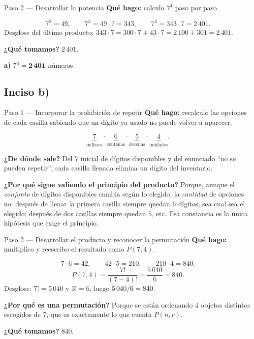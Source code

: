 \documentclass[11pt]{article}
\begin{document}
\begin{paso}{Paso 2 --- Desarrollar la potencia}
\textbf{Qué hago:} calculo $7^4$ paso por paso.

\[
7^2 = 49,\qquad 7^3 = 49\cdot 7 = 343,\qquad 7^4 = 343\cdot 7 = 2\,401 .
\]
Desglose del último producto: $343\cdot 7 = 300\cdot 7 + 43\cdot 7 = 2\,100+301 = 2\,401$.

\textbf{¿Qué tomamos?} $2\,401$.
\end{paso}

\begin{resp}
\textbf{a)} $7^4 = \mathbf{2\,401}$ números.
\end{resp}

\subsection*{Inciso b)}

\begin{paso}{Paso 1 --- Incorporar la prohibición de repetir}
\textbf{Qué hago:} recalculo las opciones de cada casilla sabiendo que un dígito ya usado no puede volver a aparecer.

\[
\underbrace{7}_{\text{millares}}\cdot \underbrace{6}_{\text{centenas}}\cdot \underbrace{5}_{\text{decenas}}\cdot \underbrace{4}_{\text{unidades}} .
\]

\textbf{¿De dónde sale?} Del $7$ inicial de dígitos disponibles y del enunciado ``no se pueden repetir''; cada casilla llenada elimina un dígito del inventario.

\textbf{¿Por qué sigue valiendo el principio del producto?} Porque, aunque el \emph{conjunto} de dígitos disponibles cambia según lo elegido, la \emph{cantidad} de opciones no: después de llenar la primera casilla siempre quedan $6$ dígitos, sea cual sea el elegido; después de dos casillas siempre quedan $5$, etc. Esa constancia es la única hipótesis que exige el principio.
\end{paso}

\begin{paso}{Paso 2 --- Desarrollar el producto y reconocer la permutación}
\textbf{Qué hago:} multiplico y reescribo el resultado como $P(7,4)$.

\[
7\cdot 6 = 42,\qquad 42\cdot 5 = 210,\qquad 210\cdot 4 = 840 .
\]
\[
P(7,4) = \frac{7!}{(7-4)!} = \frac{5\,040}{6} = 840 .
\]
Desglose: $7! = 5\,040$ y $3! = 6$, luego $5\,040/6 = 840$.

\textbf{¿Por qué es una permutación?} Porque se están ordenando $4$ objetos distintos escogidos de $7$, que es exactamente lo que cuenta $P(n,r)$.

\textbf{¿Qué tomamos?} $840$.
\end{paso}
\end{document}
